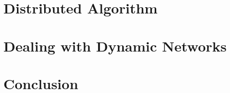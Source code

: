 \documentclass[a4paper,11pt]{article}
\begin{document}


\section{Distributed Algorithm}





\section{Dealing with Dynamic Networks}



\section{Conclusion}



\end{document}
